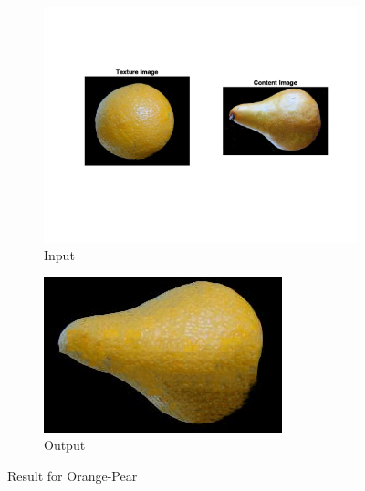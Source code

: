 \documentclass[10pt,twocolumn,letterpaper]{article}
\begin{document}
\begin{figure}[h]
    \centering
    \begin{subfigure}[h]{0.45\textwidth}
        \centering
        \includegraphics[trim={2cm 4cm 2cm 3cm}, clip, scale=0.5]{../results/bsize/inp_orange_pear.png}
        \caption{Input}
    \end{subfigure}
    \hfill
    \begin{subfigure}[h]{0.5\textwidth}
       \centering
       \includegraphics[scale=0.4]{../results/bsize/out_orange_pear_B_20_bdr_0_800000.png}
       \caption{Output}
   \end{subfigure}
   \caption{Result for Orange-Pear}
   \label{fig:ap_bs}
\end{figure}
\end{document}
